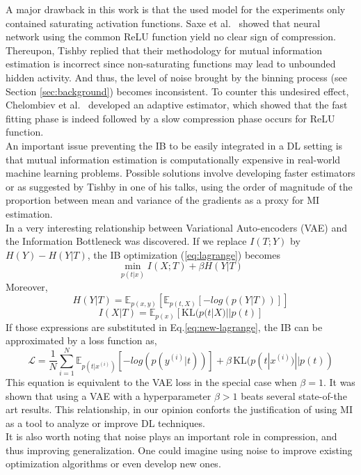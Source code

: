 \documentclass[twocolumn,superscriptaddress,aps]{revtex4-1}
\begin{document}
A major drawback in this work is that the used model for the experiments only contained saturating activation functions. Saxe et al.\ \citep{saxe} showed that neural network using the common ReLU function yield no clear sign of compression. Thereupon, Tishby replied that their methodology for mutual information estimation is incorrect since non-saturating functions may lead to unbounded hidden activity. And thus, the level of noise brought by the binning process (see Section \ref{sec:background}) becomes inconsistent. To counter this undesired effect, Chelombiev et al.\ \cite{MI1} developed an adaptive estimator, which showed that the fast fitting phase is indeed followed by a slow compression phase occurs for  ReLU function.\\
\indent An important issue preventing the IB to be easily integrated in a DL setting is that mutual information estimation is computationally expensive in real-world machine learning problems. Possible solutions involve developing faster estimators \citep{MI1, MI2} or as suggested by Tishby in one of his talks, using the order of magnitude of the proportion between mean and variance of the gradients as a proxy for MI estimation. \\
\indent In \citep{vib} a very interesting relationship between Variational Auto-encoders (VAE) \citep{Kingma} and the Information Bottleneck was discovered. If we replace $I(T;Y)$ by $ H(Y)-H(Y|T)$, the IB optimization (\ref{eq:lagrange}) becomes 
\begin{equation}
\min_{p(t|x)} I(X;T) + \beta H(Y|T)
\label{eq:new-lagrange}
\end{equation}
Moreover,
\begin{equation}
H(Y|T) = \mathbb{E}_{p(x,y)} \left[\mathbb{E}_{p(t,X)}\left[-log(p(Y|T))\right]\right]
\end{equation}\vspace*{-0.1mm}
\begin{equation}
I(X|T) = \mathbb{E}_{p(x)} \left[\text{KL}(p(t|X) || p(t) \right]
\end{equation}
If those expressions are substituted in Eq.\ref{eq:new-lagrange}, the IB can be approximated by a loss function as,
$$
\mathcal{L} = \frac{1}{N} \sum_{i=1}^{N} \mathbb{E}_{p(t|x^{(i)})} \left[-log(p(y^{(i)}|t))\right] + \beta \, \text{KL}(p(t|x^{(i)}) || p(t))
$$
This equation is equivalent to the VAE loss in the special case when $\beta = 1$. It was shown that using a VAE with a hyperparameter $\beta > 1$ beats several state-of-the art results. This relationship, in our opinion conforts the justification of using MI as a tool to analyze or improve DL techniques. \\
\indent It is also worth noting that noise plays an important role in compression, and thus improving generalization. One could imagine using noise to improve existing optimization algorithms or even develop new ones.\\




\end{document}

